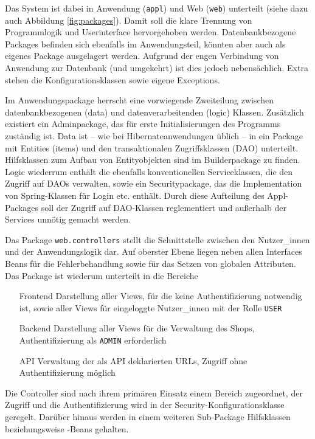 Das System ist dabei in Anwendung (\lstinline|appl|) und Web (\lstinline|web|) unterteilt (siehe dazu auch Abbildung \ref{fig:packages}). Damit soll die klare Trennung von Programmlogik und Userinterface hervorgehoben werden. Datenbankbezogene Packages befinden sich ebenfalls im Anwendungsteil, könnten aber auch als eigenes Package ausgelagert werden. Aufgrund der engen Verbindung von Anwendung zur Datenbank (und umgekehrt) ist dies jedoch nebensächlich. Extra stehen die Konfigurationsklassen sowie eigene Exceptions.

Im Anwendungspackage herrscht eine vorwiegende Zweiteilung zwischen datenbankbezogenen (data) und datenverarbeitenden (logic) Klassen. Zusätzlich existiert ein Adminpackage, das für erste Initialisierungen des Programms zuständig ist. Data ist -- wie bei Hibernateanwendungen üblich -- in ein Package mit Entities (items) und den transaktionalen Zugriffsklassen (DAO) unterteilt. Hilfsklassen zum Aufbau von Entityobjekten sind im Builderpackage zu finden. Logic wiederrum enthält die ebenfalls konventionellen Serviceklassen, die den Zugriff auf DAOs verwalten, sowie ein Securitypackage, das die Implementation von Spring-Klassen für Login etc. enthält. Durch diese Aufteilung des Appl-Packages soll der Zugriff auf DAO-Klassen reglementiert und außerhalb der Services unnötig gemacht werden.

Das Package \lstinline|web.controllers| stellt die Schnittstelle zwischen den Nutzer\_innen und der Anwendungslogik dar. Auf oberster Ebene liegen neben allen Interfaces Beans für die Fehlerbehandlung sowie für das Setzen von globalen Attributen. Das Package ist wiede\-rum unterteilt in die Bereiche
\begin{itemize}
	\item[Frontend] Darstellung aller Views, für die keine Authentifizierung notwendig ist, sowie aller Views für eingeloggte Nutzer\_innen mit der Rolle \lstinline|USER|
	\item[Backend] Darstellung aller Views für die Verwaltung des Shops, Authentifizierung als \lstinline|ADMIN| erforderlich
	\item[API] Verwaltung der als API deklarierten URLs, Zugriff ohne Authentifizierung möglich
\end{itemize}
Die Controller sind nach ihrem primären Einsatz einem Bereich zugeordnet, der Zugriff und die Authentifizierung wird in der Security-Konfigurationsklasse geregelt. Darüber hi\-naus werden in einem weiteren Sub-Package Hilfsklassen beziehungsweise -Beans gehalten.

